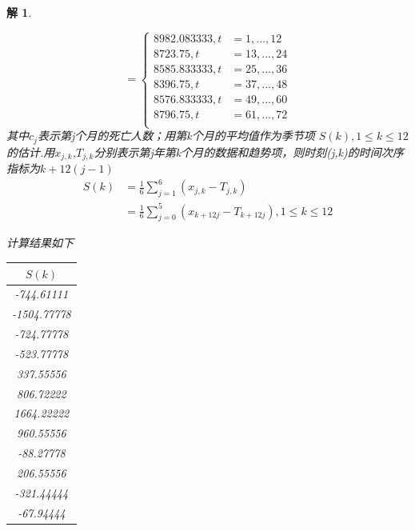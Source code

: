 \documentclass[11pt,a4paper]{ctexart}
\newtheorem*{solution}{解}
\begin{document}
\begin{enumerate}
\begin{solution}
\begin{itemize}
\begin{equation}
=\left\{
\begin{aligned}
8982.083333 , t &=1,...,12 \\
8723.75, t &=13,...,24 \\
8585.833333, t &=25,...,36 \\
8396.75, t &=37,...,48 \\
8576.833333, t &=49,...,60 \\
8796.75,t &=61,...,72 \\
\end{aligned}
\right.
\end{equation}
其中$c_j$表示第j个月的死亡人数；用第k个月的平均值作为季节项
$S(k),1\leq k\leq12$
的估计.用$x_{j,k}$,$T_{j,k}$分别表示第j年第k个月的数据和趋势项，则时刻(j,k)的时间次序指标为$k+12(j-1)$
\begin{equation}
\begin{aligned}
	S(k)&=\frac{1}{6}\sum_{j=1}^{6}(x_{j,k}-T_{j,k})\\
	&=\frac{1}{6}\sum_{j=0}^{5}(x_{k+12j}-T_{k+12j}),1\leq k\leq12
\end{aligned}
\end{equation}

计算结果如下

\begin{table}[H]   %
	\centering
	\begin{tabular}{c}
		\toprule[1.5pt]
		$S(k)$  \\
		\midrule[1pt]
		-744.61111 \\
		-1504.77778 \\
		 -724.77778 \\
		  -523.77778 \\
		    337.55556 \\
		      806.72222\\
	 1664.22222 \\
	   960.55556  \\
	    -88.27778 \\
	      206.55556 \\
	       -321.44444 \\
	         -67.94444\\
		\bottomrule[1.5pt]
	\end{tabular}
\end{table}



\end{itemize}
\end{solution}
\end{enumerate}
\end{document}
